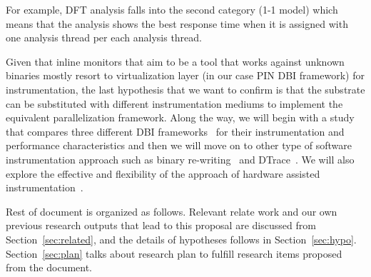 For example,  DFT analysis falls into the second category (1-1 model) which
means that the analysis shows the best response time when it is assigned with
one analysis thread per each analysis thread.  

Given that inline monitors that aim to be a tool that works against unknown
binaries mostly resort to virtualization layer (in our case PIN DBI framework)
for instrumentation, the last hypothesis that we want to confirm is that the
substrate can be substituted with different instrumentation mediums to
implement the equivalent parallelization framework. Along the way, we will
begin with a study that compares three different DBI
frameworks~\cite{pin:pldi2005, dynamorio, valgrind} for their instrumentation
and performance characteristics and then we will move on to other type of
software instrumentation approach such as binary
re-writing~\cite{brewriting:usenix2003} and DTrace~\cite{DTrace}. We will also
explore the effective and flexibility of the approach of hardware assisted
instrumentation~\cite{lba:isca2008, raksha:isca2007}.

Rest of document is organized as follows. Relevant relate work and our own
previous research outputs that lead to this proposal are discussed from
Section~\ref{sec:related}, and the details of hypotheses follows in
Section~\ref{sec:hypo}. Section~\ref{sec:plan} talks about research plan to
fulfill research items proposed from the document.

